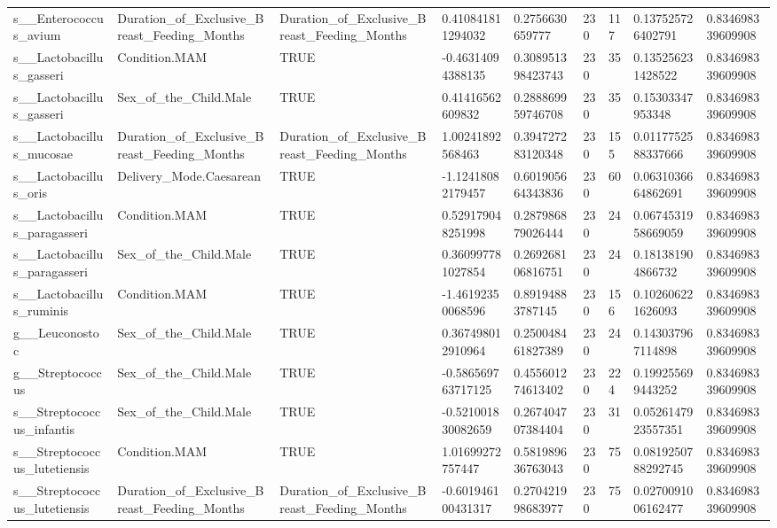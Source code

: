 \begin{longtable}{lllllllll}
s\_\_Enterococcus\_avium & Duration\_of\_Exclusive\_Breast\_Feeding\_Months & Duration\_of\_Exclusive\_Breast\_Feeding\_Months & 0.410841811294032 & 0.2756630659777 & 230 & 117 & 0.137525726402791 & 0.834698339609908 \\
s\_\_Lactobacillus\_gasseri & Condition.MAM & TRUE & -0.46314094388135 & 0.308951398423743 & 230 & 35 & 0.135256231428522 & 0.834698339609908 \\
s\_\_Lactobacillus\_gasseri & Sex\_of\_the\_Child.Male & TRUE & 0.41416562609832 & 0.288869959746708 & 230 & 35 & 0.15303347953348 & 0.834698339609908 \\
s\_\_Lactobacillus\_mucosae & Duration\_of\_Exclusive\_Breast\_Feeding\_Months & Duration\_of\_Exclusive\_Breast\_Feeding\_Months & 1.00241892568463 & 0.394727283120348 & 230 & 155 & 0.0117752588337666 & 0.834698339609908 \\
s\_\_Lactobacillus\_oris & Delivery\_Mode.Caesarean & TRUE & -1.12418082179457 & 0.601905664343836 & 230 & 60 & 0.0631036664862691 & 0.834698339609908 \\
s\_\_Lactobacillus\_paragasseri & Condition.MAM & TRUE & 0.529179048251998 & 0.287986879026444 & 230 & 24 & 0.0674531958669059 & 0.834698339609908 \\
s\_\_Lactobacillus\_paragasseri & Sex\_of\_the\_Child.Male & TRUE & 0.360997781027854 & 0.269268106816751 & 230 & 24 & 0.181381904866732 & 0.834698339609908 \\
s\_\_Lactobacillus\_ruminis & Condition.MAM & TRUE & -1.46192350068596 & 0.89194883787145 & 230 & 156 & 0.102606221626093 & 0.834698339609908 \\
g\_\_Leuconostoc & Sex\_of\_the\_Child.Male & TRUE & 0.367498012910964 & 0.250048461827389 & 230 & 24 & 0.143037967114898 & 0.834698339609908 \\
g\_\_Streptococcus & Sex\_of\_the\_Child.Male & TRUE & -0.586569763717125 & 0.455601274613402 & 230 & 224 & 0.199255699443252 & 0.834698339609908 \\
s\_\_Streptococcus\_infantis & Sex\_of\_the\_Child.Male & TRUE & -0.521001830082659 & 0.267404707384404 & 230 & 31 & 0.0526147923557351 & 0.834698339609908 \\
s\_\_Streptococcus\_lutetiensis & Condition.MAM & TRUE & 1.01699272757447 & 0.581989636763043 & 230 & 75 & 0.0819250788292745 & 0.834698339609908 \\
s\_\_Streptococcus\_lutetiensis & Duration\_of\_Exclusive\_Breast\_Feeding\_Months & Duration\_of\_Exclusive\_Breast\_Feeding\_Months & -0.601946100431317 & 0.270421998683977 & 230 & 75 & 0.0270091006162477 & 0.834698339609908 \\

\end{longtable}
